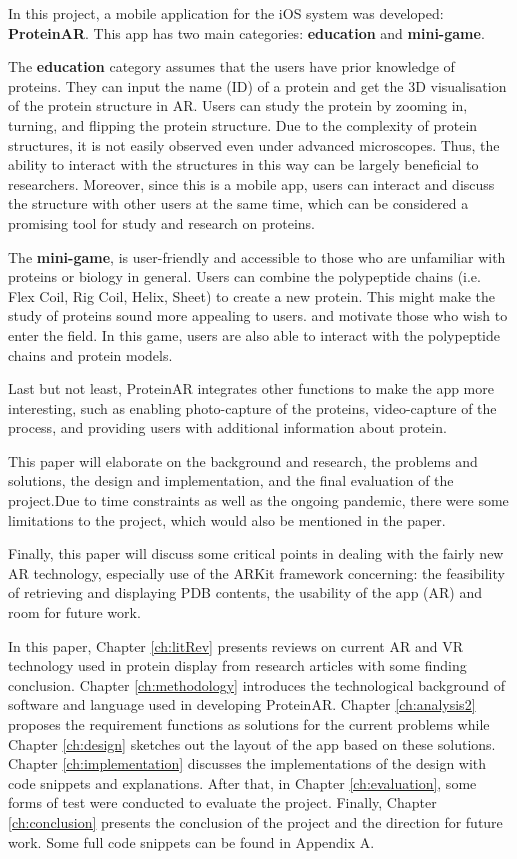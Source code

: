 In this project, a mobile application for the iOS system was developed: \textbf{ProteinAR}. This app has two main categories: \textbf{education} and \textbf{mini-game}. 

The \textbf{education} category assumes that the users have prior knowledge of proteins. They can input the name (ID) of a protein and get the 3D visualisation of the protein structure in AR. Users can study the protein by zooming in, turning, and flipping the protein structure. Due to the complexity of protein structures, it is not easily observed even under advanced microscopes. Thus, the ability to interact with the structures in this way can be largely beneficial to researchers. Moreover, since this is a mobile app, users can interact and discuss the structure with other users at the same time, which can be considered a promising tool for study and research on proteins.

The \textbf{mini-game}, is user-friendly and accessible to those who are unfamiliar with proteins or biology in general. Users can combine the polypeptide chains (i.e. Flex Coil, Rig Coil, Helix, Sheet) to create a new protein. This might make the study of proteins sound more appealing to users. and motivate those who wish to enter the field. In this game, users are also able to interact with the polypeptide chains and protein models. 

Last but not least, ProteinAR integrates other functions to make the app more interesting, such as enabling photo-capture of the proteins, video-capture of the process, and providing users with additional information about protein.

This paper will elaborate on the background and research, the problems and solutions, the design and implementation, and the final evaluation of the project.Due to time constraints as well as the ongoing pandemic, there were some limitations to the project, which would also be mentioned in the paper. 

Finally, this paper will discuss some critical points in dealing with the fairly new AR technology, especially use of the ARKit framework concerning: the feasibility of retrieving and displaying PDB contents, the usability of the app (AR) and room for future work.

In this paper, Chapter \ref{ch:litRev} presents reviews on current AR and VR technology used in protein display from research articles with some finding conclusion. Chapter \ref{ch:methodology} introduces the technological background of software and language used in developing ProteinAR. Chapter \ref{ch:analysis2} proposes the requirement functions as solutions for the current problems while Chapter \ref{ch:design} sketches out the layout of the app based on these solutions. Chapter \ref{ch:implementation} discusses the implementations of the design with code snippets and explanations. After that, in Chapter \ref{ch:evaluation}, some forms of test were conducted to evaluate the project. Finally, Chapter \ref{ch:conclusion} presents the conclusion of the project and the direction for future work. Some full code snippets can be found in Appendix A. 

